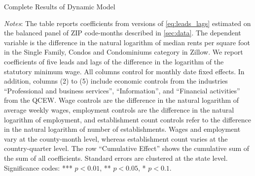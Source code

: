 \clearpage
\begin{table}[h!]
	\caption{Complete Results of Dynamic Model}
	\label{tab:dynamic_lags_leads_main}
	\centering
	
	\begin{minipage}{0.95\textwidth} \footnotesize
		\vspace{3mm} 
		\textit{Notes}: The table reports coefficients from versions of 
		\autoref{eq:leads_lags} estimated on the balanced panel of ZIP code-months
		described in \autoref{sec:data}. The dependent variable is the difference in 
		the natural logarithm of median	rents per square foot in the Single Family, Condos 
		and Condominiums category in Zillow. We report coefficients of five leads and lags 
		of the difference in the logarithm of the statutory minimum wage. All columns 
		control for monthly date fixed effects. In addition, columns (2) to (5) include 
		economic controls from the industries ``Professional and business services'', 
		``Information'', and ``Financial activities'' from the QCEW. Wage controls are 
		the difference in the natural logarithm of average weekly wages, employment 
		controls are the difference in the natural logarithm of employment, and 
		establishment count controls refer to the difference in the natural logarithm 
		of number of establishments. Wages and employment vary at the county-month level,
		whereas establishment count varies at the country-quarter level. The row 
		``Cumulative Effect'' shows the cumulative 	sum of the sum of all coefficients. 
		Standard errors are clustered at the state level. Significance codes: *** $p < 
		0.01$, ** $p < 0.05$, * $p < 0.1$.
	\end{minipage}
\end{table}


